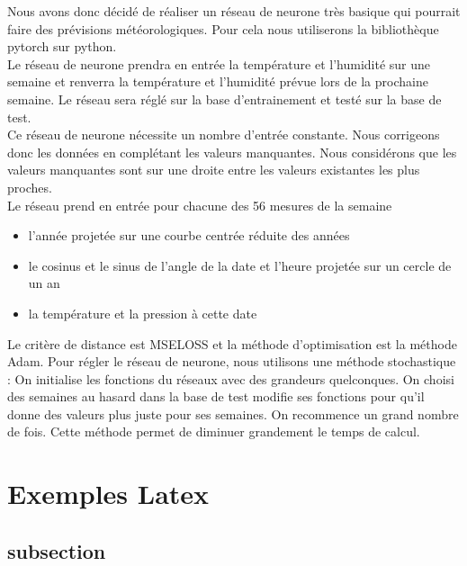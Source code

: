 \documentclass[11pt,a4paper]{article}
\begin{document}
Nous avons donc décidé de réaliser un réseau de neurone très basique qui pourrait faire des prévisions météorologiques. Pour cela nous utiliserons la bibliothèque pytorch sur python.\\
Le réseau de neurone prendra en entrée la température et l'humidité sur une semaine et renverra la température et l'humidité prévue lors de la prochaine semaine. Le réseau sera réglé sur la base d'entrainement et testé sur la base de test.\\
Ce réseau de neurone nécessite un nombre d'entrée constante. Nous corrigeons donc les données en complétant les valeurs manquantes. Nous considérons que les valeurs manquantes sont sur une droite entre les valeurs existantes les plus proches.\\
Le réseau prend en entrée pour chacune des 56 mesures de la semaine 
\begin{itemize}
\item  l'année projetée sur une courbe centrée réduite des années
\item  le cosinus et le sinus de l'angle de la date et l'heure projetée sur un cercle de un an
\item  la température et la pression à cette date
\end{itemize}
Le critère de distance est MSELOSS et la méthode d'optimisation est la méthode Adam.
Pour régler le réseau de neurone, nous utilisons une méthode stochastique : 
On initialise les fonctions du réseaux avec des grandeurs quelconques.
On choisi des semaines au hasard dans la base de test modifie ses fonctions pour qu'il donne des valeurs plus juste pour ses semaines. On recommence un grand nombre de fois. Cette méthode permet de diminuer grandement le temps de calcul.






























\section{Exemples Latex}
\subsection{subsection}
\end{document}
